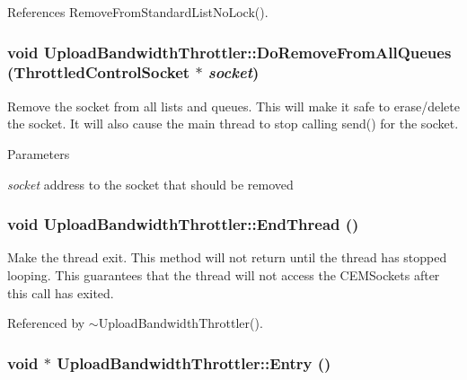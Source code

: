 References RemoveFromStandardListNoLock().
\subsubsection[{DoRemoveFromAllQueues}]{\setlength{\rightskip}{0pt plus 5cm}void UploadBandwidthThrottler::DoRemoveFromAllQueues ({\bf ThrottledControlSocket} $\ast$ {\em socket})\hspace{0.3cm}{\ttfamily  [private]}}\label{classUploadBandwidthThrottler_a6c2191d293025fcb68d187071ec039e4}


Remove the socket from all lists and queues. This will make it safe to erase/delete the socket. It will also cause the main thread to stop calling send() for the socket.


\begin{DoxyParams}{Parameters}
\item[{\em socket}]address to the socket that should be removed \end{DoxyParams}
\subsubsection[{EndThread}]{\setlength{\rightskip}{0pt plus 5cm}void UploadBandwidthThrottler::EndThread ()}\label{classUploadBandwidthThrottler_ae3a606235cabf197c6e7d0def8391000}


Make the thread exit. This method will not return until the thread has stopped looping. This guarantees that the thread will not access the CEMSockets after this call has exited. 

Referenced by $\sim$UploadBandwidthThrottler().
\subsubsection[{Entry}]{\setlength{\rightskip}{0pt plus 5cm}void $\ast$ UploadBandwidthThrottler::Entry ()\hspace{0.3cm}{\ttfamily  [private]}}\label{classUploadBandwidthThrottler_a646fad8f57fe8cc645392ff98f6e50f9}


